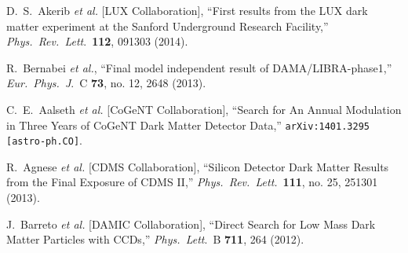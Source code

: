 \documentclass[12pt]{article}
\begin{document}
\pagebreak

\begin{thebibliography}{99}



  D.~S.~Akerib {\it et al.}  [LUX Collaboration],
  ``First results from the LUX dark matter experiment at the Sanford Underground Research Facility,''
  \textit{Phys.\ Rev.\ Lett}.\  {\bf 112}, 091303 (2014).


  R.~Bernabei {\it et al.},
  ``Final model independent result of DAMA/LIBRA-phase1,''
  \textit{Eur.\ Phys.\ J}.\ C {\bf 73}, no. 12, 2648 (2013).

  C.~E.~Aalseth {\it et al.}  [CoGeNT Collaboration],
  ``Search for An Annual Modulation in Three Years of CoGeNT Dark Matter Detector Data,''
  \texttt{arXiv:1401.3295 [astro-ph.CO]}.

  R.~Agnese {\it et al.}  [CDMS Collaboration],
  ``Silicon Detector Dark Matter Results from the Final Exposure of CDMS II,''
  \textit{Phys.\ Rev.\ Lett.}\  {\bf 111}, no. 25, 251301 (2013).



  J.~Barreto {\it et al.}  [DAMIC Collaboration],
  ``Direct Search for Low Mass Dark Matter Particles with CCDs,''
  \textit{Phys.\ Lett}.\ B {\bf 711}, 264 (2012).
 

\end{thebibliography}
\end{document}
